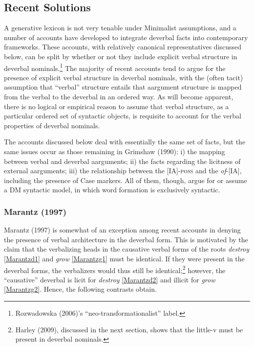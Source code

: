 \documentclass[12pt]{article}
\begin{document}
\doublespacing

\subsection{Recent Solutions}\label{priors3}

A generative lexicon is not very tenable under Minimalist assumptions, and a number of accounts have developed to integrate deverbal facts into contemporary frameworks. These accounts, with relatively canonical representatives discussed below, can be split by whether or not they include explicit verbal structure in deverbal nominals.\footnote{ Rozwadowska (2006)'s ``neo-transformationalist'' label.} The majority of recent accounts tend to argue for the presence of explicit verbal structure in deverbal nominals, with the (often tacit) assumption that ``verbal'' structure entails that aargument structure is mapped from the verbal to the deverbal in an ordered way. As will become apparent, there is no logical or empirical reason to assume that verbal structure, as a particular ordered set of syntactic objects, is requisite to account for the verbal properties of deverbal nominals.

The accounts discussed below deal with essentially the same set of facts, but the same issues occur as those remaining in Grimshaw (1990): i) the mapping between verbal and deverbal aarguments; ii) the facts regarding the licitness of external aarguments; iii) the relationship between the [IA]-\textsc{poss} and the \textit{of}-[IA], including the presence of Case markers. All of them, though, argue for or assume a DM syntactic model, in which word formation is exclusively syntactic.

\subsubsection{Marantz (1997)}\label{priors3.1}

Marantz (1997) is somewhat of an exception among recent accounts in denying the presence of verbal architecture in the deverbal form. This is motivated by the claim that the verbalizing heads in the causative verbal forms of the roots \textit{destroy} \ref{Marantzd1} and \textit{grow} \ref{Marantzg1} must be identical. If they were present in the deverbal forms, the verbalizers would thus still be identical;\footnote{ Harley (2009), discussed in the next section, shows that the little-v must be present in deverbal nominals.} however, the ``causative'' deverbal is licit for \textit{destroy} \ref{Marantzd2} and illicit for \textit{grow} \ref{Marantzg2}. Hence, the following contrasts obtain.
\end{document}
